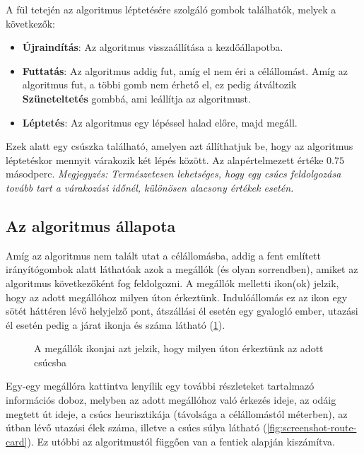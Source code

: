 A fül tetején az algoritmus léptetésére szolgáló gombok találhatók, melyek a következők:
\begin{itemize}
	\item \textbf{Újraindítás}: Az algoritmus visszaállítása a kezdőállapotba.
	\item \textbf{Futtatás}: Az algoritmus addig fut, amíg el nem éri a célállomást. Amíg az algoritmus fut, a többi gomb nem érhető el, ez pedig átváltozik \textbf{Szüneteltetés} gombbá, ami leállítja az algoritmust.
	\item \textbf{Léptetés}: Az algoritmus egy lépéssel halad előre, majd megáll.
\end{itemize}

Ezek alatt egy csúszka található, amelyen azt állíthatjuk be, hogy az algoritmus léptetéskor mennyit várakozik két lépés között. Az alapértelmezett értéke $0.75$ másodperc.
\textit{Megjegyzés: Természetesen lehetséges, hogy egy csúcs feldolgozása tovább tart a várakozási időnél, különösen alacsony értékek esetén.}

\subsection{Az algoritmus állapota}

Amíg az algoritmus nem talált utat a célállomásba, addig a fent említett irányítógombok alatt láthatóak azok a megállók (és olyan sorrendben), amiket az algoritmus következőként fog feldolgozni. A megállók melletti ikon(ok) jelzik, hogy az adott megállóhoz milyen úton érkeztünk. Indulóállomás ez az ikon egy sötét háttéren lévő helyjelző pont, átszállási él esetén egy gyalogló ember, utazási él esetén pedig a járat ikonja és száma látható (\ref{fig:screenshot-icons}).

\begin{figure}[H]
	\centering
	\hspace{5pt}
	\hspace{5pt}
	\caption{A megállók ikonjai azt jelzik, hogy milyen úton érkeztünk az adott csúcsba}
	\label{fig:screenshot-icons}
\end{figure}

Egy-egy megállóra kattintva lenyílik egy további részleteket tartalmazó információs doboz, melyben az adott megállóhoz való érkezés ideje, az odáig megtett út ideje, a csúcs heurisztikája (távolsága a célállomástól méterben), az útban lévő utazási élek száma, illetve a csúcs súlya látható (\ref{fig:screenshot-route-card}). Ez utóbbi az algoritmustól függően van a fentiek alapján kiszámítva.

